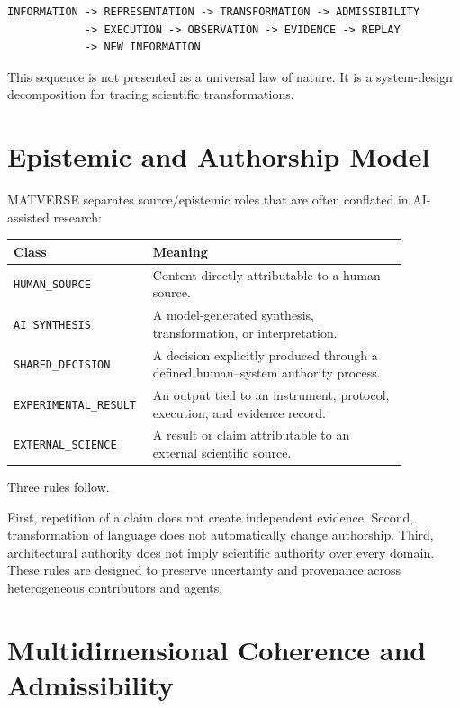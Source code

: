 \documentclass[11pt]{article}
\begin{document}
\begin{verbatim}
INFORMATION -> REPRESENTATION -> TRANSFORMATION -> ADMISSIBILITY
            -> EXECUTION -> OBSERVATION -> EVIDENCE -> REPLAY
            -> NEW INFORMATION
\end{verbatim}

This sequence is not presented as a universal law of nature. It is a system-design decomposition for tracing scientific transformations.

\section{Epistemic and Authorship Model}

MATVERSE separates source/epistemic roles that are often conflated in AI-assisted research:

\begin{center}
\begin{tabular}{p{0.25\linewidth}p{0.62\linewidth}}
\toprule
\textbf{Class} & \textbf{Meaning} \\
\midrule
\texttt{HUMAN\_SOURCE} & Content directly attributable to a human source. \\
\texttt{AI\_SYNTHESIS} & A model-generated synthesis, transformation, or interpretation. \\
\texttt{SHARED\_DECISION} & A decision explicitly produced through a defined human--system authority process. \\
\texttt{EXPERIMENTAL\_RESULT} & An output tied to an instrument, protocol, execution, and evidence record. \\
\texttt{EXTERNAL\_SCIENCE} & A result or claim attributable to an external scientific source. \\
\bottomrule
\end{tabular}
\end{center}

Three rules follow.

First, repetition of a claim does not create independent evidence. Second, transformation of language does not automatically change authorship. Third, architectural authority does not imply scientific authority over every domain. These rules are designed to preserve uncertainty and provenance across heterogeneous contributors and agents.

\section{Multidimensional Coherence and Admissibility}
\end{document}
